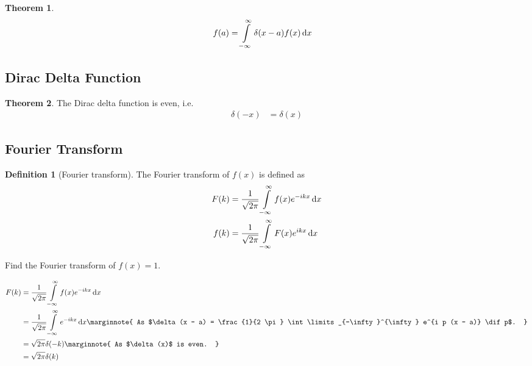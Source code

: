 \documentclass[titlepage, fleqn, a4paper, 12pt, twoside]{article}
\theoremstyle{definition}
\newtheorem{definition}{Definition}
\theoremstyle{theorem}
\newtheorem{theorem}{Theorem}
\begin{document}
\begin{theorem}
	\begin{align*}
		f(a) &= \int\limits_{-\infty}^{\infty} \delta(x - a) f(x) \dif x
	\end{align*}
\end{theorem}

\subsection{Dirac Delta Function}

\begin{theorem}
	The Dirac delta function is even, i.e.
	\begin{align*}
		\delta(-x) &= \delta(x)
	\end{align*}
\end{theorem}

\subsection{Fourier Transform}

\begin{definition}[Fourier transform]
	The Fourier transform of $f(x)$ is defined as
	\begin{align*}
		F(k) &= \frac{1}{\sqrt{2 \pi}} \int\limits_{-\infty}^{\infty} f(x) e^{-i k x} \dif x\\
		f(k) &= \frac{1}{\sqrt{2 \pi}} \int\limits_{-\infty}^{\infty} F(x) e^{i k x} \dif x
	\end{align*}
\end{definition}

\begin{question}
	Find the Fourier transform of $f(x) = 1$.
\end{question}

\begin{solution}
	\begin{align*}
		F(k) &= \frac{1}{\sqrt{2 \pi}} \int\limits_{-\infty}^{\infty} f(x) e^{-i k x} \dif x\\
		&= \frac{1}{\sqrt{2 \pi}} \int\limits_{-\infty}^{\infty} e^{-i k x} \dif x
		\marginnote
		{
			As $\delta(x - a) = \frac{1}{2 \pi} \int\limits_{-\infty}^{\infty} e^{i p (x - a)} \dif p$.
		}\\
		&= \sqrt{2 \pi} \delta(-k)
		\marginnote
		{
			As $\delta(x)$ is even.
		}\\
		&= \sqrt{2 \pi} \delta(k)
	\end{align*}
\end{solution}
\end{document}
